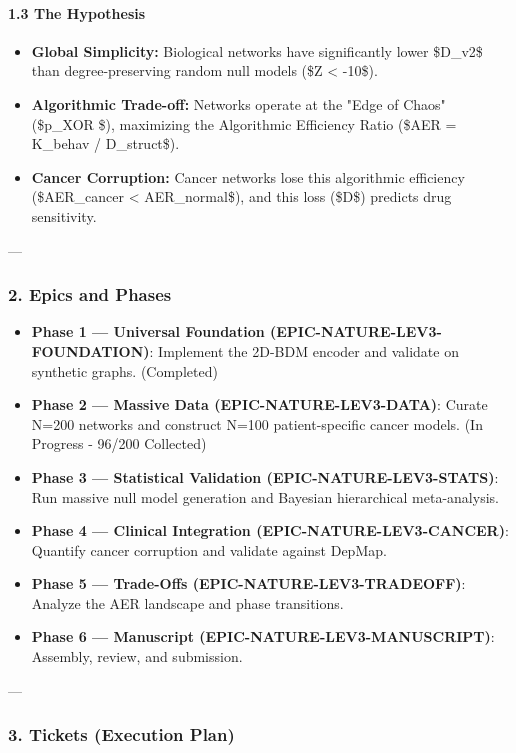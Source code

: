 \documentclass{article}
\begin{document}
\paragraph{1.3 The Hypothesis}
\begin{itemize}
\item   \textbf{Global Simplicity:} Biological networks have significantly lower \$D\_{v2}\$ than degree-preserving random null models (\$Z < -10\$).
\item   \textbf{Algorithmic Trade-off:} Networks operate at the "Edge of Chaos" (\$p\_{XOR} \$), maximizing the Algorithmic Efficiency Ratio (\$AER = K\_{behav} / D\_{struct}\$).
\item   \textbf{Cancer Corruption:} Cancer networks lose this algorithmic efficiency (\$AER\_{cancer} < AER\_{normal}\$), and this loss (\$\Delta D\$) predicts drug sensitivity.
\end{itemize}

---

\subsubsection{2. Epics and Phases}

\begin{itemize}
\item   \textbf{Phase 1 — Universal Foundation (EPIC-NATURE-LEV3-FOUNDATION)}: Implement the 2D-BDM encoder and validate on synthetic graphs. (Completed)
\item   \textbf{Phase 2 — Massive Data (EPIC-NATURE-LEV3-DATA)}: Curate N=200 networks and construct N=100 patient-specific cancer models. (In Progress - 96/200 Collected)
\item   \textbf{Phase 3 — Statistical Validation (EPIC-NATURE-LEV3-STATS)}: Run massive null model generation and Bayesian hierarchical meta-analysis.
\item   \textbf{Phase 4 — Clinical Integration (EPIC-NATURE-LEV3-CANCER)}: Quantify cancer corruption and validate against DepMap.
\item   \textbf{Phase 5 — Trade-Offs (EPIC-NATURE-LEV3-TRADEOFF)}: Analyze the AER landscape and phase transitions.
\item   \textbf{Phase 6 — Manuscript (EPIC-NATURE-LEV3-MANUSCRIPT)}: Assembly, review, and submission.
\end{itemize}

---

\subsubsection{3. Tickets (Execution Plan)}
\end{document}
